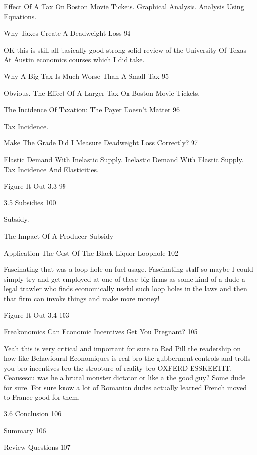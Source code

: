 Effect Of A Tax On Boston Movie Tickets. Graphical Analysis. Analysis Using Equations.

Why Taxes Create A Deadweight Loss 94

OK this is still all basically good strong solid review of the University Of Texas At Austin economics courses which I did take.

Why A Big Tax Is Much Worse Than A Small Tax 95

Obvious. The Effect Of A Larger Tax On Boston Movie Tickets.

The Incidence Of Taxation: The Payer Doesn't Matter 96

Tax Incidence.

Make The Grade Did I Measure Deadweight Loss Correctly? 97

Elastic Demand With Inelastic Supply. Inelastic Demand With Elastic Supply. Tax Incidence And Elasticities.

Figure It Out 3.3 99



3.5 Subsidies 100

Subsidy.

The Impact Of A Producer Subsidy

Application The Cost Of The Black-Liquor Loophole 102

Fascinating that was a loop hole on fuel usage. Fascinating stuff so maybe I could simply try and get employed at one of these big firms as some kind of a dude a legal trawler who finds economically useful such loop holes in the laws and then that firm can invoke things and make more money!

Figure It Out 3.4 103



Freakonomics Can Economic Incentives Get You Pregnant? 105

Yeah this is very critical and important for sure to Red Pill the readership on how like Behavioural Economiques is real bro the gubberment controls and trolls you bro incentives bro the strooture of reality bro OXFERD ESSKEETIT. Ceausescu was he a brutal monster dictator or like a the good guy? Some dude for sure. For sure know a lot of Romanian dudes actually learned French moved to France good for them.

3.6 Conclusion 106



Summary 106



Review Questions 107



